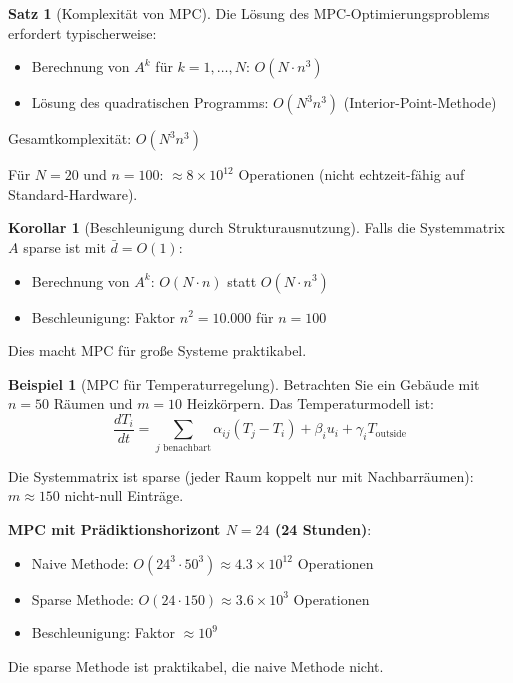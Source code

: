 ﻿\documentclass[a4paper,12pt]{report}
\theoremstyle{definition}
\newtheorem{beispiel}{Beispiel}
\newtheorem{satz}{Satz}
\newtheorem{korollar}{Korollar}
\begin{document}
	\begin{satz}[Komplexität von MPC]
		Die Lösung des MPC-Optimierungsproblems erfordert typischerweise:
		\begin{itemize}
			\item Berechnung von $A^k$ für $k = 1, \ldots, N$: $O(N \cdot n^3)$
			\item Lösung des quadratischen Programms: $O(N^3 n^3)$ (Interior-Point-Methode)
		\end{itemize}
		
		Gesamtkomplexität: $O(N^3 n^3)$
		
		Für $N = 20$ und $n = 100$: $\approx 8 \times 10^{12}$ Operationen (nicht echtzeit-fähig auf Standard-Hardware).
	\end{satz}
	
	\begin{korollar}[Beschleunigung durch Strukturausnutzung]
		Falls die Systemmatrix $A$ sparse ist mit $\bar{d} = O(1)$:
		\begin{itemize}
			\item Berechnung von $A^k$: $O(N \cdot n)$ statt $O(N \cdot n^3)$
			\item Beschleunigung: Faktor $n^2 = 10.000$ für $n = 100$
		\end{itemize}
		
		Dies macht MPC für große Systeme praktikabel.
	\end{korollar}
	
	\begin{beispiel}[MPC für Temperaturregelung]
		Betrachten Sie ein Gebäude mit $n = 50$ Räumen und $m = 10$ Heizkörpern. Das Temperaturmodell ist:
		\[
		\frac{dT_i}{dt} = \sum_{j \text{ benachbart}} \alpha_{ij} (T_j - T_i) + \beta_i u_i + \gamma_i T_{\text{outside}}
		\]
		
		Die Systemmatrix ist sparse (jeder Raum koppelt nur mit Nachbarräumen): $m \approx 150$ nicht-null Einträge.
		
		\textbf{MPC mit Prädiktionshorizont $N = 24$ (24 Stunden)}:
		\begin{itemize}
			\item Naive Methode: $O(24^3 \cdot 50^3) \approx 4.3 \times 10^{12}$ Operationen
			\item Sparse Methode: $O(24 \cdot 150) \approx 3.6 \times 10^3$ Operationen
			\item Beschleunigung: Faktor $\approx 10^9$
		\end{itemize}
		
		Die sparse Methode ist praktikabel, die naive Methode nicht.
	\end{beispiel}
	
\end{document}
